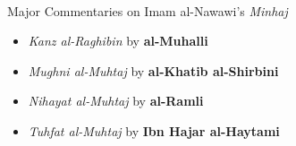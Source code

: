 \documentclass[
  a4paper,
  DIV=11,
  numbers=noendperiod]{scrartcl}
\makeatletter
\let\oldparagraph\paragraph
\renewcommand{\paragraph}{
    \@ifstar
      \xxxParagraphStar
      \xxxParagraphNoStar
  }
\newcommand{\xxxParagraphStar}[1]{\oldparagraph*{#1}\mbox{}}
\newcommand{\xxxParagraphNoStar}[1]{\oldparagraph{#1}\mbox{}}
\providecommand{\tightlist}{%
  \setlength{\itemsep}{0pt}\setlength{\parskip}{0pt}}
\makeatother
\begin{document}
\paragraph{\texorpdfstring{Major Commentaries on Imam al-Nawawi's
\emph{Minhaj}}{Major Commentaries on Imam al-Nawawi's Minhaj}}\label{major-commentaries-on-imam-al-nawawis-minhaj}

\begin{itemize}
\tightlist
\item
  \emph{Kanz al-Raghibin} by \textbf{al-Muhalli}
\item
  \emph{Mughni al-Muhtaj} by \textbf{al-Khatib al-Shirbini}
\item
  \emph{Nihayat al-Muhtaj} by \textbf{al-Ramli}
\item
  \emph{Tuhfat al-Muhtaj} by \textbf{Ibn Hajar al-Haytami}
\end{itemize}
\end{document}
